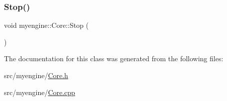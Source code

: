 \mbox{\label{classmyengine_1_1_core_ab93156cb1b35d422d2827ffe1e431b4a}} 
\subsubsection{\texorpdfstring{Stop()}{Stop()}}
{\footnotesize\ttfamily void myengine\+::\+Core\+::\+Stop (\begin{DoxyParamCaption}{ }\end{DoxyParamCaption})}



The documentation for this class was generated from the following files\+:\begin{DoxyCompactItemize}
\item 
src/myengine/\hyperlink{_core_8h}{Core.\+h}\item 
src/myengine/\hyperlink{_core_8cpp}{Core.\+cpp}\end{DoxyCompactItemize}
